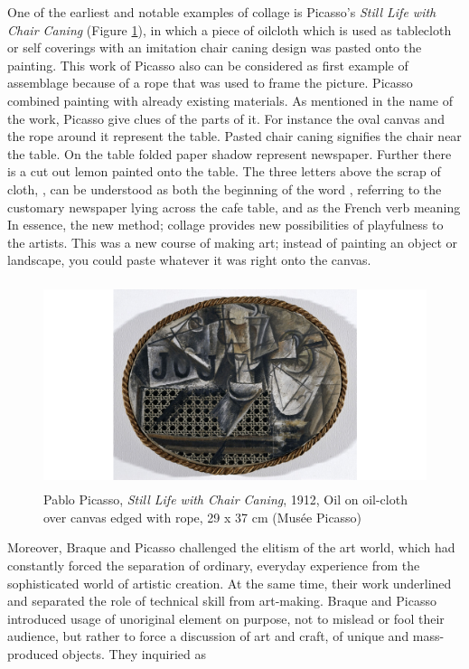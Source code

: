 One of the earliest and notable examples of collage is Picasso’s \textit{Still Life with Chair Caning} (Figure \ref{fig:Picasso_Chair}), in which a piece of oilcloth which is used as tablecloth or self coverings with an imitation chair caning design was pasted onto the painting. This work of Picasso also can be considered as first example of assemblage because of a rope that was used to frame the picture. Picasso combined painting with already existing materials. As mentioned in the name of the work, Picasso give clues of the parts of it. For instance the oval canvas and the rope around it represent the table. Pasted chair caning signifies the chair near the table. On the table folded paper shadow represent newspaper. Further there is a cut out lemon painted onto the table. The three letters above the scrap of cloth, , can be understood as both the beginning of the word , referring to the customary newspaper lying across the cafe table, and as the French verb meaning  In essence, the new method; collage provides new possibilities of playfulness to the artists. This was a new course of making art; instead of painting an object or landscape, you could paste whatever it was right onto the canvas.

\begin{figure}[h!]
  \centering
  \includegraphics[height=6cm]{graphics/picasso_chair.png}
  \caption{Pablo Picasso, \textit{Still Life with Chair Caning}, 1912, Oil on oil-cloth over canvas edged with rope, 29 x 37 cm (Musée Picasso)}
  \label{fig:Picasso_Chair}
\end{figure}

Moreover, Braque and Picasso challenged the elitism of the art world, which had constantly forced the separation of ordinary, everyday experience from the sophisticated world of artistic creation. At the same time, their work underlined and separated the role of technical skill from art-making. Braque and Picasso introduced usage of unoriginal element on purpose, not to mislead or fool their audience, but rather to force a discussion of art and craft, of unique and mass-produced objects. They inquiried as 

